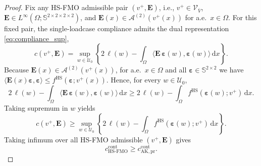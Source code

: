 \documentclass[preprint,3p]{elsarticle}
\newcommand{\tens}[1]{\bm{\mathit{#1}}}             %
\newcommand{\tenss}[1]{\bm{\mathbf{#1}}}            %
\newcommand{\tensf}[1]{\bm{\mathbf{#1}}}            %
\newcommand{\strain}{\tenss{\varepsilon}}           %
\begin{document}
\begin{proof}
Fix any HS-FMO admissible pair $(v^+,\tensf E)$, i.e.,
$v^+\in\mathcal V_{\overline{V}}$,
$\tensf E\in L^\infty(\Omega;\mathbb{S}^{2\times2\times2\times2})$,
and $\tensf E(\tens{x})\in\mathcal A^{(2)}(v^+(\tens{x}))$ for a.e.\ $\tens{x}\in\Omega$.
For this fixed pair, the single-loadcase compliance admits the dual representation \eqref{eq:compliance_sup},
%
\begin{equation}
c(v^+,\tensf E)
=
\sup_{\tens{w}\in\mathcal U_0}
\left\{
2\,\ell(\tens{w})
-\int_\Omega \langle \tensf E\,\strain(\tens{w}),\strain(\tens{w})\rangle\,\mathrm d\tens{x}
\right\}.
\end{equation}
%
Because $\tensf E(\tens{x})\in\mathcal A^{(2)}(v^+(\tens{x}))$, for a.e.\ $\tens{x}\in\Omega$ and all $\strain\in\mathbb{S}^{2\times2}$ we have $\langle \tensf E(\tens{x})\strain,\strain\rangle \le f^{\mathrm{HS}}(\strain;v^+(\tens{x}))$. Hence, for every $\tens{w}\in\mathcal U_0$,
%
\begin{equation}
2\,\ell(\tens{w})
-\int_\Omega \langle \tensf E\,\strain(\tens{w}),\strain(\tens{w})\rangle\,\mathrm d\tens{x}
\ge
2\,\ell(\tens{w})
-\int_\Omega f^{\mathrm{HS}}(\strain(\tens{w});v^+)\,\mathrm d\tens{x}.
\end{equation}
%
Taking supremum in $\tens{w}$ yields
%
\begin{equation}
c(v^+,\tensf E)\ge
\sup_{\tens{w}\in\mathcal U_0}
\left\{
2\,\ell(\tens{w})
-\int_\Omega f^{\mathrm{HS}}(\strain(\tens{w});v^+)\,\mathrm d\tens{x}
\right\}.
\end{equation}
%
Taking infimum over all HS-FMO admissible $(v^+,\tensf E)$ gives
%
\begin{equation}\label{eq:tight_first_ineq}
c_{\mathrm{HS\text{-}FMO}}^{\mathrm{cont}}
\ge
c_{\mathrm{AK,pr}}^{\mathrm{cont}}.
\end{equation}


\end{proof}
\end{document}
